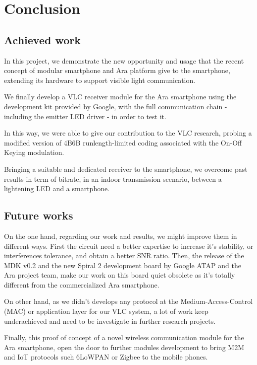 
\chapter{Conclusion}

\label{Conclusion}



\section{Achieved work}

In this project, we demonstrate the new opportunity and usage that the recent concept of modular smartphone and Ara platform give to the smartphone, extending its hardware to support visible light communication.

We finally develop a VLC receiver module for the Ara smartphone using the development kit provided by Google, with the full communication chain - including the emitter LED driver - in order to test it.

In this way, we were able to give our contribution to the VLC research, probing a modified version of 4B6B runlength-limited coding associated with the On-Off Keying modulation.

Bringing a suitable and dedicated receiver to the smartphone, we overcome past results in term of bitrate, in an indoor transmission scenario, between a lightening LED and a smartphone.



\section{Future works}

On the one hand, regarding our work and results, we might improve them in different ways. First the circuit need a better expertise to increase it's stability, or interferences tolerance, and obtain a better SNR ratio.
Then, the release of the MDK v0.2 and the new Spiral 2 development board by Google ATAP and the Ara project team, make our work on this board quiet obsolete as it's totally different from the commercialized Ara smartphone.

On other hand, as we didn't develops any protocol at the Medium-Access-Control (MAC) or application layer for our VLC system, a lot of work keep underachieved and need to be investigate in further research projects.

Finally, this proof of concept of a novel wireless communication module for the Ara smartphone, open the door to further modules development to bring  M2M and IoT protocols such 6LoWPAN or Zigbee to the mobile phones.